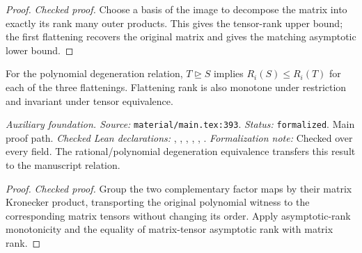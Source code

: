 \begin{proof}
\leanok
{}
\textit{Checked proof.} Choose a basis of the image to decompose the matrix into exactly its rank many outer products. This gives the tensor-rank upper bound; the first flattening recovers the original matrix and gives the matching asymptotic lower bound.
\end{proof}

\renewcommand{\thetheorem}{A51}
\begin{lemma}
\label{aux:flattening-degeneration}
\leanok
For the polynomial degeneration relation, $T\trianglerighteq S$ implies $R_i(S)\le R_i(T)$ for each of the three flattenings. Flattening rank is also monotone under restriction and invariant under tensor equivalence.
\end{lemma}

\noindent\textit{Auxiliary foundation. Source:} \texttt{material/main.tex:393}.
\textit{Status:} \texttt{formalized}. Main proof path.
\textit{Checked Lean declarations:} , , , , , .
\textit{Formalization note:} Checked over every field. The rational/polynomial degeneration equivalence transfers this result to the manuscript relation.

\begin{proof}
\leanok
{}
\textit{Checked proof.} Group the two complementary factor maps by their matrix Kronecker product, transporting the original polynomial witness to the corresponding matrix tensors without changing its order. Apply asymptotic-rank monotonicity and the equality of matrix-tensor asymptotic rank with matrix rank.
\end{proof}

